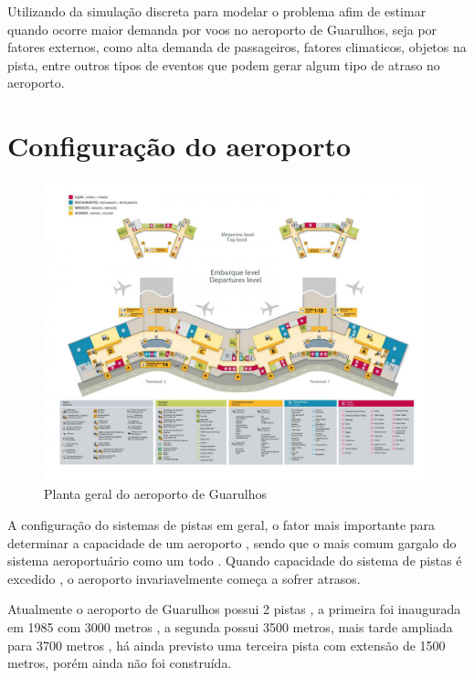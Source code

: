 \documentclass[12pt]{article}
\begin{document}
Utilizando da simulação discreta para modelar o problema afim de estimar
quando ocorre maior demanda por voos no aeroporto de Guarulhos, seja por
fatores externos, como alta demanda de passageiros, fatores climaticos,
objetos na pista, entre outros tipos de eventos que podem gerar algum 
tipo de atraso no aeroporto.



\section{Configuração do aeroporto}

\begin{figure}[b!]
  \centering
  \includegraphics[width=.9\textwidth]{aeroporto.png}
  \caption{Planta geral do aeroporto de Guarulhos}
  \label{fig:aeropoto}
\end{figure}

A configuração do sistemas de pistas em geral, o fator mais importante
para determinar a capacidade de um aeroporto , sendo que o mais comum 
gargalo do sistema aeroportuário como um todo . Quando capacidade do 
sistema de pistas é excedido , o aeroporto invariavelmente começa a 
sofrer atrasos.



Atualmente o aeroporto de Guarulhos possui 2 pistas , a primeira foi 
inaugurada em 1985 com  3000 metros , a segunda possui 3500 metros, 
mais tarde ampliada para 3700 metros , há ainda previsto uma terceira
pista com extensão de 1500 metros, porém ainda não foi construída. 
\end{document}
